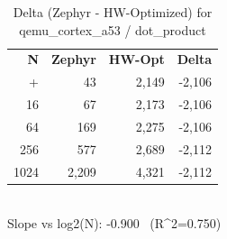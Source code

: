 \begin{table}[tb]
    \centering
    \caption{Delta (Zephyr - HW-Optimized) for qemu_cortex_a53 / dot_product}
    \label{tab:delta_qemu_cortex_a53_dot_product}
    \scriptsize
    \begin{tabular}{r r r r}
        \hline
        \textbf{N} & \textbf{Zephyr} & \textbf{HW-Opt} & \textbf{Delta} \\\n+        \hline
        4 & 43 & 2,149 & -2,106\\
        16 & 67 & 2,173 & -2,106\\
        64 & 169 & 2,275 & -2,106\\
        256 & 577 & 2,689 & -2,112\\
        1024 & 2,209 & 4,321 & -2,112\\
        \hline
    \end{tabular}
    \vspace{2mm}\\\n    Slope vs log2(N): -0.900 \ (R^2=0.750)\n\end{table}
